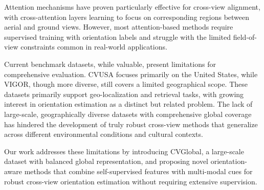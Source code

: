 Attention mechanisms have proven particularly effective for cross-view alignment, with cross-attention layers learning to focus on corresponding regions between aerial and ground views. However, most attention-based methods require supervised training with orientation labels and struggle with the limited field-of-view constraints common in real-world applications.

Current benchmark datasets, while valuable, present limitations for comprehensive evaluation. CVUSA focuses primarily on the United States, while VIGOR, though more diverse, still covers a limited geographical scope. These datasets primarily support geo-localization and retrieval tasks, with growing interest in orientation estimation as a distinct but related problem. The lack of large-scale, geographically diverse datasets with comprehensive global coverage has hindered the development of truly robust cross-view methods that generalize across different environmental conditions and cultural contexts.

Our work addresses these limitations by introducing CVGlobal, a large-scale dataset with balanced global representation, and proposing novel orientation-aware methods that combine self-supervised features with multi-modal cues for robust cross-view orientation estimation without requiring extensive supervision.